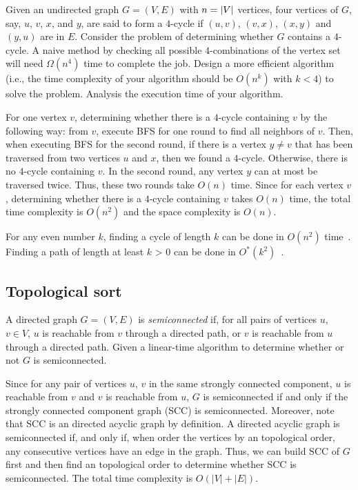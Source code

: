 \begin{Exercise}[origin={NCU CSIE 95}]
Given an undirected graph $G = (V, E)$ with $n = \lvert V\rvert$ vertices, four vertices of $G$, say, $u$, $v$, $x$, and $y$, are said to form a $4$-cycle if $(u, v)$, $(v, x)$, $(x, y)$ and $(y, u)$ are in $E$. Consider the problem of determining whether $G$ contains a $4$-cycle. A naive method by checking all possible $4$-combinations of the vertex set will need $\Omega(n^4)$ time to complete the job. Design a more efficient algorithm (i.e., the time complexity of your algorithm should be $O(n^k)$ with $k < 4$) to solve the problem. Analysis the execution time of your algorithm.
\end{Exercise}
\begin{Answer}
For one vertex $v$, determining whether there is a $4$-cycle containing $v$ by the following way: from $v$, execute BFS for one round to find all neighbors of $v$. Then, when executing BFS for the second round, if there is a vertex $y \neq v$ that has been traversed from two vertices $u$ and $x$, then we found a $4$-cycle. Otherwise, there is no $4$-cycle containing $v$. In the second round, any vertex $y$ can at most be traversed twice. Thus, these two rounds take $O(n)$ time. Since for each vertex $v$, determining whether there is a $4$-cycle containing $v$ takes $O(n)$ time, the total time complexity is $O(n^2)$ and the space complexity is $O(n)$.
\begin{remark}
For any even number $k$, finding a cycle of length $k$ can be done in $O(n^2)$ time~\cite{Yuster1997}. Finding a path of length at least $k$ > 0 can be done in $O^*(k^2)$~\cite{RWilliams2009}.
\end{remark}
\end{Answer}

\subsection{Topological sort}
\begin{Exercise}[origin={NCKU CSIE 106}]
A directed graph $G = (V, E)$ is \emph{semiconnected} if, for all pairs of vertices $u$, $v \in V$, $u$ is reachable from $v$ through a directed path, or $v$ is reachable from $u$ through a directed path. Given a linear-time algorithm to determine whether or not $G$ is semiconnected.
\end{Exercise}
\begin{Answer}
Since for any pair of vertices $u$, $v$ in the same strongly connected component, $u$ is reachable from $v$ and $v$ is reachable from $u$, $G$ is semiconnected if and only if the strongly connected component graph (SCC) is semiconnected. Moreover, note that SCC is an directed acyclic graph by definition. A directed acyclic graph is semiconnected if, and only if, when order the vertices by an topological order, any consecutive vertices have an edge in the graph. Thus, we can build SCC of $G$ first and then find an topological order to determine whether SCC is semiconnected. The total time complexity is $O(|V| + |E|)$.
\end{Answer}

